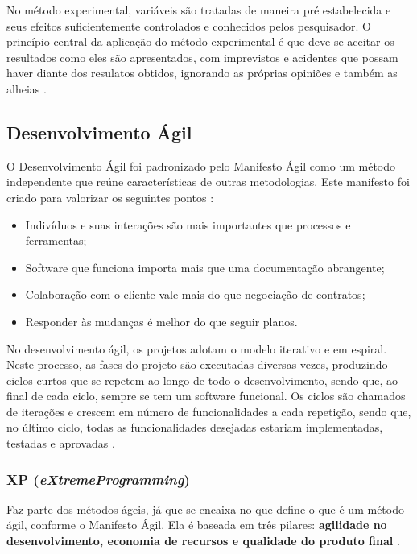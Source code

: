 No método experimental, variáveis são tratadas de maneira pré estabelecida e seus efeitos suficientemente controlados  e conhecidos pelos pesquisador. O princípio central da aplicação do método experimental é que deve-se aceitar os resultados como eles são apresentados, com imprevistos e acidentes que possam haver diante dos resulatos obtidos, ignorando as próprias opiniões e também as alheias \cite{fachin-metodos}.

\subsection{Desenvolvimento Ágil}\label{subsec:devagil}
O Desenvolvimento Ágil foi padronizado pelo Manifesto Ágil como um método independente que reúne características de outras metodologias. Este manifesto foi criado para valorizar os seguintes pontos \cite{dev-agil}:

\begin{itemize}
	\item Indivíduos e suas interações são mais importantes que processos e ferramentas;
	\item Software que funciona importa mais que uma documentação abrangente;
	\item Colaboração com o cliente vale mais do que negociação de contratos;
	\item Responder às mudanças é melhor do que seguir planos.
\end{itemize}

No desenvolvimento ágil, os projetos adotam o modelo iterativo e em espiral. Neste processo, as fases do projeto são executadas diversas vezes, produzindo ciclos curtos que se repetem ao longo de todo o desenvolvimento, sendo que, ao final de cada ciclo, sempre se tem um software funcional. Os ciclos são chamados de iterações e crescem em número de funcionalidades a cada repetição, sendo que, no último ciclo, todas as funcionalidades desejadas estariam implementadas, testadas e aprovadas \cite{dev-agil2}.

\subsubsection{XP (\textit{eXtremeProgramming})}

Faz parte dos métodos ágeis, já que se encaixa no que define o que é um método ágil, conforme o Manifesto Ágil. Ela é baseada em três pilares: \textbf{agilidade no desenvolvimento, economia de recursos e qualidade do produto final} \cite{dev-agil2}.

